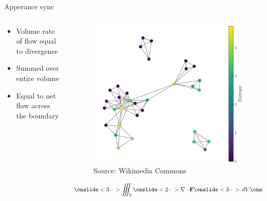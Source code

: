 \documentclass[handout]{beamer}
\begin{document}
\begin{frame}{Apperance sync}
    \begin{columns}

        \begin{column}{0.6\textwidth}
            \begin{itemize}
                \item<2-> Volume rate of flow equal to divergence
                \item<3-> Summed over entire volume
                \item<4-> Equal to net flow across the boundary
            \end{itemize}
        \end{column}

        \begin{column}{0.4\textwidth}
            \begin{figure}
                \centering
                    \includegraphics[width=\textwidth]{../Figures/problemGraph.pdf}
                    \caption{Source: Wikimedia Commons}
            \end{figure}
            \begin{equation*}
                \onslide<3->{\iiint_V}\onslide<2->{\nabla\cdot\textbf{F}}\onslide<3->{\,dV}\onslide<4->{=\oiint_A \textbf{F}\cdot d\textbf{A}}
            \end{equation*}
        \end{column}

    \end{columns}
\end{frame}
\end{document}
